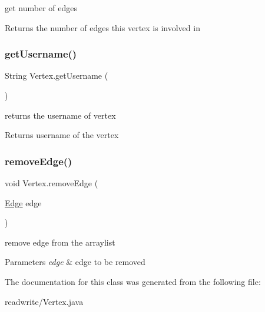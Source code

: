get number of edges 

\begin{DoxyReturn}{Returns}
the number of edges this vertex is involved in 
\end{DoxyReturn}
\mbox{\label{class_vertex_a24b931258451256742b50b09b5a8e13f}} 
\subsubsection{\texorpdfstring{get\+Username()}{getUsername()}}
{\footnotesize\ttfamily String Vertex.\+get\+Username (\begin{DoxyParamCaption}{ }\end{DoxyParamCaption})}



returns the username of vertex 

\begin{DoxyReturn}{Returns}
username of the vertex 
\end{DoxyReturn}
\mbox{\label{class_vertex_a74032add8df85233c3979374471a3141}} 
\subsubsection{\texorpdfstring{remove\+Edge()}{removeEdge()}}
{\footnotesize\ttfamily void Vertex.\+remove\+Edge (\begin{DoxyParamCaption}\item[{\hyperlink{class_edge}{Edge}}]{edge }\end{DoxyParamCaption})}



remove edge from the arraylist 


\begin{DoxyParams}{Parameters}
{\em edge} & edge to be removed \\
\hline
\end{DoxyParams}


The documentation for this class was generated from the following file\+:\begin{DoxyCompactItemize}
\item 
readwrite/Vertex.\+java\end{DoxyCompactItemize}
